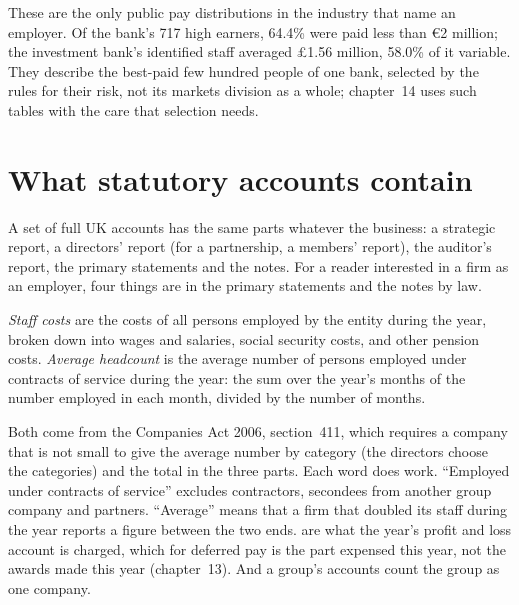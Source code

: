 These are the only public pay distributions in the industry that name an employer. Of the bank's 717 high earners,
64.4\% were paid less than \euro2 million; the investment bank's identified staff averaged \pounds1.56 million, 58.0\%
of it variable. They describe the best-paid few hundred people of one bank, selected by the rules for their risk, not
its markets division as a whole; chapter~14 uses such tables with the care that selection needs.

\section{What statutory accounts contain}

A set of full UK accounts has the same parts whatever the business: a strategic report, a directors' report (for a partnership, a members' report), the auditor's report, the primary statements and the notes.
For a reader interested in a firm as an employer, four things are in the primary statements and the notes by law.

\begin{definition}\label{def:in:reading-a-trading-firms-accounts:staff}
\emph{Staff costs} are the costs of all persons employed by the entity during the year, broken
down into wages and salaries, social security costs, and other pension costs. \emph{Average
headcount} is the average number of persons employed under contracts of service during the
year: the sum over the year's months of the number employed in each month, divided by the number of months.
\end{definition}

Both come from the Companies Act 2006, section~411, which requires a company that is not small to give the average
number by category (the directors choose the categories) and the total  in the three parts. Each word does
work. ``Employed under contracts of service'' excludes contractors, secondees from another group company and
partners. ``Average'' means that a firm that doubled its staff during the year reports a figure between the two ends.
 are what the year's profit and loss account is charged, which for deferred pay is the part expensed this
year, not the awards made this year (chapter~13). And a group's accounts count the group as one company.

